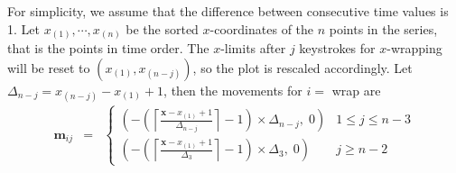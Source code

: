 \documentclass[12pt]{article}
\begin{document}
\begin{itemize}
For simplicity, we assume that the difference between consecutive
time values is 1. Let $x_{(1)},\cdots,x_{(n)}$ be the sorted
$x$-coordinates of the $n$ points in the series, that is the
points in time order. The $x$-limits after $j$ keystrokes for
$x$-wrapping will be reset to $(x_{(1)}, x_{(n-j)})$, so the
plot is rescaled accordingly. Let $\Delta_{n-j}=x_{(n-j)}-x_{(1)}+1$,
then the movements for $i=$ wrap are
\begin{eqnarray*}
\mathbf{m}{}_{ij} & = & \begin{cases}
(-\left(\left\lceil \frac{\mathbf{x}-x_{(1)}+1}{\Delta_{n-j}}\right\rceil -1\right)\times\Delta_{n-j}, \; 0) & 1\leq j \leq n-3 \\
(-\left(\left\lceil \frac{\mathbf{x}-x_{(1)}+1}{\Delta_3}\right\rceil -1\right)\times\Delta_3, \; 0) & j\ge n-2
\end{cases} \\
\end{eqnarray*}
%


\end{itemize}
\end{document}
